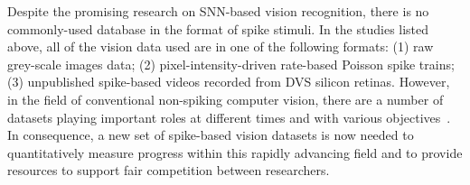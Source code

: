 \documentclass{frontiersENG} %
\begin{document}
Despite the promising research on SNN-based vision recognition, there is no commonly-used database in the format of spike stimuli.
In the studies listed above, all of the vision data used are in one of the following formats:
(1) raw grey-scale images data;
(2) pixel-intensity-driven rate-based Poisson spike trains;
(3) unpublished spike-based videos recorded from DVS silicon retinas.
However, in the field of conventional non-spiking computer vision, there are a number of datasets playing important roles at different times and with various objectives~\citep{lecun1998gradient,deng2009imagenet,blank2005actions,liu2009recognizing}.
In consequence, a new set of spike-based vision datasets is now needed to quantitatively measure progress within this rapidly advancing field and to provide resources to support fair competition between researchers.
\end{document}
